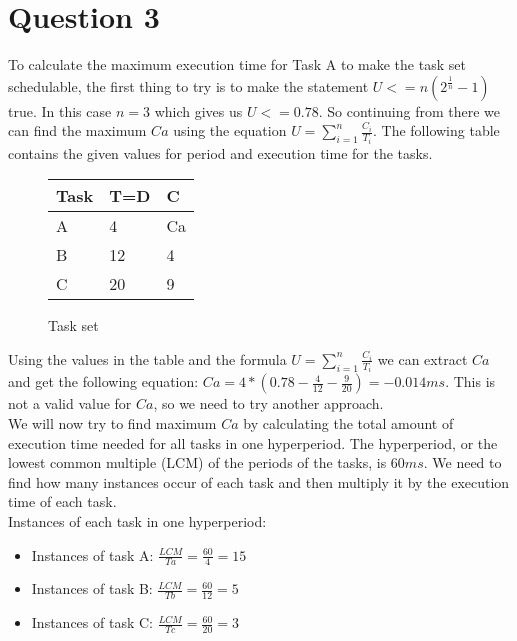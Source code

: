 \section{Question 3}

    To calculate the maximum execution time for Task A to make the task set schedulable, the first thing to try is to make the statement $U <= n(2^{\frac{1}{n}} - 1)$ true. In this case $n = 3$ which gives us $U <= 0.78$. So continuing from there we can find the maximum $Ca$ using the equation $U = \sum_{i=1}^{n} \frac{C_i}{T_i}$. The following table contains the given values for period and execution time for the tasks.
    \renewcommand{\arraystretch}{1.4}
        \begin{figure}[H]
        \centering
        \begin{minipage}{0.5\textwidth}
            \begin{table}[H]
            \centering
            \begin{tabular}{|l|l|l|}
                \hline
                \textbf{Task}   & \textbf{T=D}  & \textbf{C}  \\ \hline
                A               & 4             & Ca          \\ \hline
                B               & 12            & 4           \\ \hline
                C               & 20            & 9           \\ \hline

            \end{tabular}
            \end{table}
        \end{minipage}%
        \caption{Task set}
        \label{fig:Q3tasks}
        \end{figure}
    \renewcommand{\arraystretch}{1.0}

    Using the values in the table and the formula $U = \sum_{i=1}^{n} \frac{C_i}{T_i}$ we can extract $Ca$ and get the following equation: $Ca = 4*(0.78 - \frac{4}{12} - \frac{9}{20}) = -0.014ms$. This is not a valid value for $Ca$, so we need to try another approach.\\
    
    We will now try to find maximum $Ca$ by calculating the total amount of execution time needed for all tasks in one hyperperiod. The hyperperiod, or the lowest common multiple (LCM) of the periods of the tasks, is $60ms$. We need to find how many instances occur of each task and then multiply it by the execution time of each task.\\
    Instances of each task in one hyperperiod:
    \begin{itemize}
        \item Instances of task A: $\frac{LCM}{Ta} = \frac{60}{4} = 15$
        \item Instances of task B: $\frac{LCM}{Tb} = \frac{60}{12} = 5$
        \item Instances of task C: $\frac{LCM}{Tc} = \frac{60}{20} = 3$
    \end{itemize}
    
